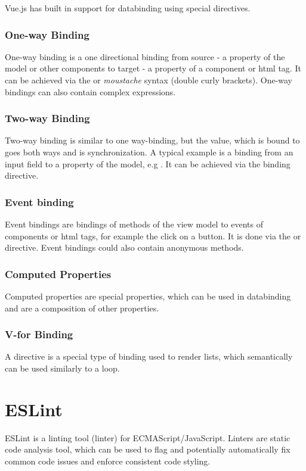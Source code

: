 Vue.js has built in support for \gls{databinding} using special directives.

\subsubsection{One-way Binding}
One-way binding is a one directional binding from source - a property of the model or other components to target - a property of a component or html tag. It can be achieved via the  or \textit{moustache} syntax (double curly brackets). One-way bindings can also contain complex expressions.

\subsubsection{Two-way Binding}
Two-way binding is similar to one way-binding, but the value, which is bound to goes both ways and is synchronization. A typical example is a binding from an input field to a property of the model, e.g . It can be achieved via the  binding directive.

\subsubsection{Event binding}
Event bindings are bindings of methods of the view model to events of components or html tags, for example the click on a button. It is done via the  or  directive. Event bindings could also contain anonymous methods.

\subsubsection{Computed Properties}
Computed properties are special properties, which can be used in \gls{databinding} and are a composition of other properties. 

\subsubsection{V-for Binding}
A  directive is a special type of binding used to render lists, which semantically can be used similarly to a  loop.

\section{ESLint}

ESLint \parencite{eslintMainPage} is a linting tool (linter) for ECMAScript/JavaScript. Linters are static code analysis tool, which can be used to flag and potentially automatically fix common code issues and enforce consistent code styling.

